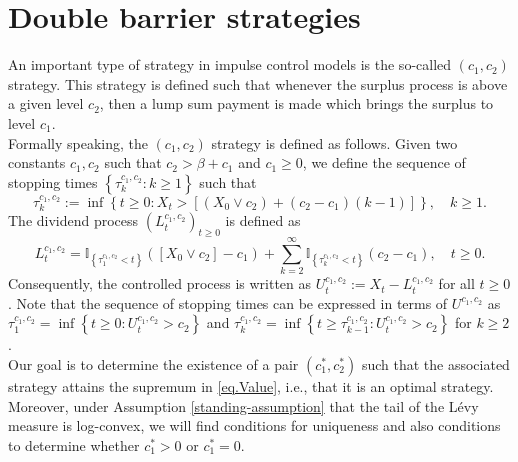 \documentclass[11pt,reqno]{amsart}
\newcommand{\Ind}{\mathbb{I}}
\newcommand{\BRA}[1]{{{\left\{#1\right\}}}} %
\renewcommand{\geq}{\geqslant}
\begin{document}
\section{Double barrier strategies}\label{Sec:Barrier}
An important type of strategy in impulse control models is the so-called $(c_1,c_2)$ strategy. This strategy is defined such that whenever the surplus process is above a given level $c_2$, then a lump sum payment is made which brings the surplus to level $c_1$.\\
Formally speaking, the $(c_1,c_2)$ strategy is defined as follows. Given two constants $c_1,c_2$ such that $c_2 > \beta + c_1$ and $c_1 \geq 0$, we define the sequence of stopping times $\BRA{\tau^{c_1,c_2}_k : k \geq 1}$ such that
\[
\tau^{c_1,c_2}_k := \inf \BRA{t\geq 0: X_t > [(X_0 \vee c_2) + (c_2 - c_1)(k-1)]}, \quad k \geq 1.
\]
The dividend process $(L^{c_1,c_2}_t)_{t\geq 0}$ is defined as
\[
L^{c_1,c_2}_t =\Ind_{\BRA{\tau^{c_1,c_2}_1 < t}}([X_0 \vee c_2] - c_1) + \sum_{k=2}^{\infty}\Ind_{\BRA{\tau^{c_1,c_2}_k<t}}(c_2-c_1), \quad t\geq 0.
\]
Consequently, the controlled process is written as $U^{c_1,c_2}_t := X_t - L^{c_1,c_2}_t$ for all $t \geq 0$. Note that the sequence of stopping times can be expressed in terms of $U^{c_1,c_2}$ as $\tau^{c_1,c_2}_1 = \inf\BRA{t\geq 0: U^{c_1,c_2}_t > c_2}$ and $\tau^{c_1,c_2}_k = \inf\BRA{t \geq \tau^{c_1,c_2}_{k-1}: U^{c_1,c_2}_t > c_2 }$ for $k \geq 2$.\\
Our goal is to determine the existence of a pair $(c_1^\ast,c_2^\ast)$ such that the associated strategy attains the supremum in \eqref{eq.Value}, i.e., that it is an optimal strategy. Moreover, under Assumption \ref{standing-assumption} that the tail of the L\'evy measure is log-convex, we will find conditions for uniqueness and also conditions to determine whether $c_1^\ast > 0$ or $c_1^\ast = 0$.
\end{document}
